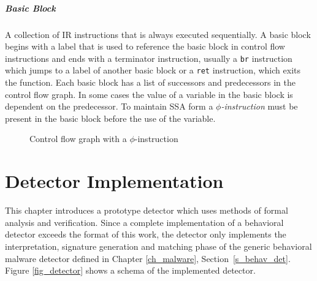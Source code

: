 \paragraph*{Basic Block} A collection of IR instructions that is always executed sequentially. A basic block begins with a label that is used to reference the basic block in control flow instructions and ends with a terminator instruction, usually a \texttt{br} instruction which jumps to a label of another basic block or a \texttt{ret} instruction, which exits the function. Each basic block has a list of successors and predecessors in the control flow graph. In some cases the value of a variable in the basic block is dependent on the predecessor. To maintain \textsc{SSA} form a \emph{$\phi$-instruction} must be present in the basic block before the use of the variable.

\begin{figure}[H]
    \centering
    \caption{Control flow graph with a $\phi$-instruction}
    \label{fig_cfg_phi}
\end{figure}

\chapter{Detector Implementation}
\label{ch_detector}
This chapter introduces a prototype detector which uses methods of formal analysis and verification. Since a complete implementation of a behavioral detector exceeds the format of this work, the detector only implements the interpretation, signature generation and matching phase of the generic behavioral malware detector defined in Chapter \ref{ch_malware}, Section~\ref{s_behav_det}. Figure \ref{fig_detector} shows a schema of the implemented detector.

